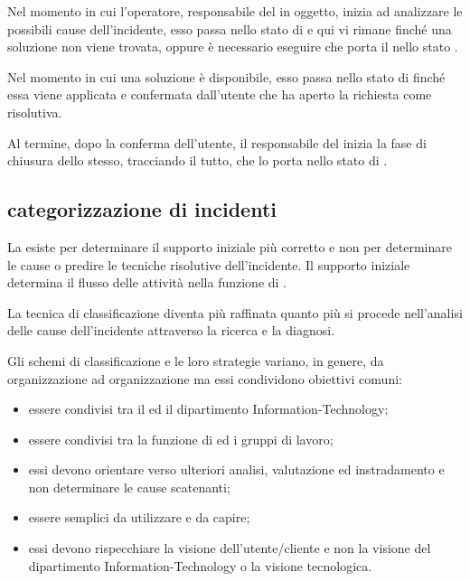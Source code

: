 Nel momento in cui l'operatore, responsabile del  in oggetto, inizia ad analizzare le possibili cause dell'incidente, esso passa nello stato di  e qui vi rimane finché una soluzione non viene trovata, oppure è necessario eseguire  che porta il  nello stato .

Nel momento in cui una soluzione è disponibile, esso passa nello stato di  finché essa viene applicata e confermata dall'utente che ha aperto la richiesta come risolutiva.

Al termine, dopo la conferma dell'utente, il responsabile del  inizia la fase di chiusura dello stesso, tracciando il tutto, che lo porta nello stato di .

\subsection[Categorizzazione di incidenti]{categorizzazione di incidenti}
\label{prc-incident-category}
La  esiste per determinare il supporto iniziale più corretto e non per determinare le cause o predire le tecniche risolutive dell'incidente. Il supporto iniziale determina il flusso delle attività nella funzione di .

La tecnica di classificazione diventa più raffinata quanto più si procede nell'analisi delle cause dell'incidente attraverso la ricerca e la diagnosi.

Gli schemi di classificazione e le loro strategie variano, in genere, da organizzazione ad organizzazione ma essi condividono obiettivi comuni:

\begin{itemize}
\item{essere condivisi tra il  ed il dipartimento \acs{Information-Technology};}
\item{essere condivisi tra la funzione di  ed i gruppi di lavoro;}
\item{essi devono orientare verso ulteriori analisi, valutazione ed instradamento e non determinare le cause scatenanti;}
\item{essere semplici da utilizzare e da capire;}
\item{essi devono rispecchiare la visione dell'utente/cliente e non la visione del dipartimento \acs{Information-Technology} o la visione tecnologica.}
\end{itemize}

